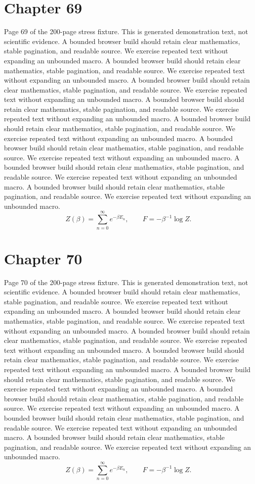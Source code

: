 \documentclass[11pt]{article}
\begin{document}
\section*{Chapter 69}
Page 69 of the 200-page stress fixture. This is generated demonstration text, not scientific evidence.
A bounded browser build should retain clear mathematics, stable pagination, and readable source. We exercise repeated text without expanding an unbounded macro.
A bounded browser build should retain clear mathematics, stable pagination, and readable source. We exercise repeated text without expanding an unbounded macro.
A bounded browser build should retain clear mathematics, stable pagination, and readable source. We exercise repeated text without expanding an unbounded macro.
A bounded browser build should retain clear mathematics, stable pagination, and readable source. We exercise repeated text without expanding an unbounded macro.
A bounded browser build should retain clear mathematics, stable pagination, and readable source. We exercise repeated text without expanding an unbounded macro.
A bounded browser build should retain clear mathematics, stable pagination, and readable source. We exercise repeated text without expanding an unbounded macro.
A bounded browser build should retain clear mathematics, stable pagination, and readable source. We exercise repeated text without expanding an unbounded macro.
A bounded browser build should retain clear mathematics, stable pagination, and readable source. We exercise repeated text without expanding an unbounded macro.
\[Z(\beta)=\sum_{n=0}^{\infty}e^{-\beta E_n},\qquad F=-\beta^{-1}\log Z.\]
\newpage
\section*{Chapter 70}
Page 70 of the 200-page stress fixture. This is generated demonstration text, not scientific evidence.
A bounded browser build should retain clear mathematics, stable pagination, and readable source. We exercise repeated text without expanding an unbounded macro.
A bounded browser build should retain clear mathematics, stable pagination, and readable source. We exercise repeated text without expanding an unbounded macro.
A bounded browser build should retain clear mathematics, stable pagination, and readable source. We exercise repeated text without expanding an unbounded macro.
A bounded browser build should retain clear mathematics, stable pagination, and readable source. We exercise repeated text without expanding an unbounded macro.
A bounded browser build should retain clear mathematics, stable pagination, and readable source. We exercise repeated text without expanding an unbounded macro.
A bounded browser build should retain clear mathematics, stable pagination, and readable source. We exercise repeated text without expanding an unbounded macro.
A bounded browser build should retain clear mathematics, stable pagination, and readable source. We exercise repeated text without expanding an unbounded macro.
A bounded browser build should retain clear mathematics, stable pagination, and readable source. We exercise repeated text without expanding an unbounded macro.
\[Z(\beta)=\sum_{n=0}^{\infty}e^{-\beta E_n},\qquad F=-\beta^{-1}\log Z.\]
\newpage
\end{document}
